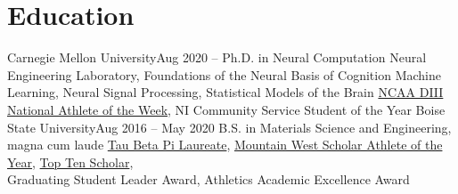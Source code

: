 \documentclass[letterpaper,10pt]{article}
\begin{document}
\section{Education}
  \resumeSubHeadingListStart
    \resumeSubheading
      {Carnegie Mellon University}{Aug 2020 -- }{Ph.D. in Neural Computation}
      \resumeItemListStart
          {Neural Engineering Laboratory, Foundations of the Neural Basis of Cognition}
          {Machine Learning, Neural Signal Processing, Statistical Models of the Brain}
        {\href{https://www.cmu.edu/dietrich/news/news-stories/2022/may/hammer-kendra-noneman.html}{NCAA DIII National Athlete of the Week}, NI Community Service Student of the Year}
      \resumeItemListEnd
  \resumeSubHeadingListEnd
  \vspace*{-0.2cm}
  \resumeSubHeadingListStart
    \resumeSubheading
      {Boise State University}{Aug 2016 -- May 2020}
      {B.S. in Materials Science and Engineering, magna cum laude}
      \resumeItemListStart
          {\href{https://www.boisestate.edu/news/2019/10/02/mechanical-science-and-engineering-athlete-kendra-noneman-recognized-for-excellence/}{Tau Beta Pi Laureate}, \href{https://broncosports.com/news/2020/7/30/general-noneman-named-mw-scholar-athlete-of-the-year}{Mountain West Scholar Athlete of the Year}, \href{https://www.boisestate.edu/news/2020/04/23/boise-state-alumni-association-honors-top-10-scholars-at-virtual-may-7-event/}{Top Ten Scholar}, \\ Graduating Student Leader Award, Athletics Academic Excellence Award}
      \resumeItemListEnd
  \resumeSubHeadingListEnd

\end{document}

